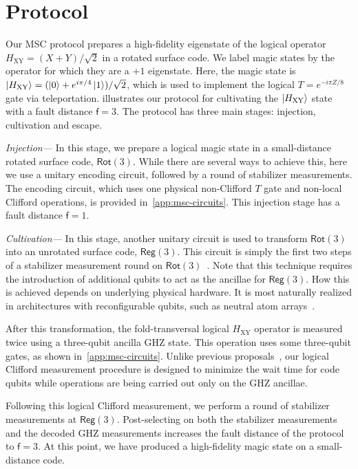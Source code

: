 \documentclass[%
    aps, 
    physrev,
    reprint,
]{revtex4-2}
\newcommand{\fd}[1]{\mathsf{f}=#1}
\newcommand{\rot}[1]{\mathsf{Rot}(#1)}
\newcommand{\reg}[1]{\mathsf{Reg}(#1)}
\newcommand{\XY}{_\mathrm{XY}}
\begin{document}
\section{Protocol}\label{sec:protocol}

Our MSC protocol prepares a high-fidelity eigenstate of the logical operator $H\XY = (X+Y)/\sqrt{2}$ in a rotated surface code.
We label magic states by the operator for which they are a $+1$ eigenstate. 
Here, the magic state is $\ket{H\XY} =(\ket{0}+e^{i\pi/4}\ket{1})/\sqrt{2}$, which is used to implement the logical $T =e^{-i\pi Z/8}$ gate via teleportation.
 illustrates our protocol for cultivating the $\ket{H\XY}$ state with a fault distance $\fd3$. 
The protocol has three main stages: injection, cultivation and escape.

\textit{Injection---} 
In this stage, {we prepare a} logical magic state in a small-distance rotated surface code, $\rot3$.
While there are several ways to achieve this, 
here we use a unitary encoding circuit, followed by a round of stabilizer measurements.
The encoding circuit, which uses one physical non-Clifford $T$ gate and non-local Clifford operations, is provided in~\cref{app:msc-circuits}. 
This injection stage has a fault distance $\fd1$.

\textit{Cultivation---} 
In this stage, another unitary circuit is used to transform $\rot3$ into an unrotated surface code, $\reg3$. 
This circuit is simply the first two steps of a stabilizer measurement round on $\rot3$~\cite{mcewen2023relaxing}.
Note that this technique requires the introduction of additional qubits to act as the ancillae for $\reg3$.
How this is achieved depends on underlying physical hardware.
It is most naturally realized in architectures with reconfigurable qubits, such as neutral atom arrays~\cite{bluvstein2024logical}.

After this transformation, the fold-transversal logical $H\XY$ operator is measured twice using a three-qubit ancilla GHZ state. 
This operation uses some three-qubit gates, as shown in~\cref{app:msc-circuits}. 
Unlike previous proposals~\cite{gidney2024magic, vaknin2025magic, chen2025efficient}, our logical Clifford measurement procedure is designed to minimize the wait time for code qubits while operations are being carried out only on the GHZ ancillae.

Following this logical Clifford measurement, we perform a round of stabilizer measurements at $\reg3$. 
Post-selecting on both the stabilizer measurements and the decoded GHZ measurements increases the fault distance of the protocol to $\fd3$. 
At this point, we have produced a high-fidelity magic state on a small-distance code. 
\end{document}
